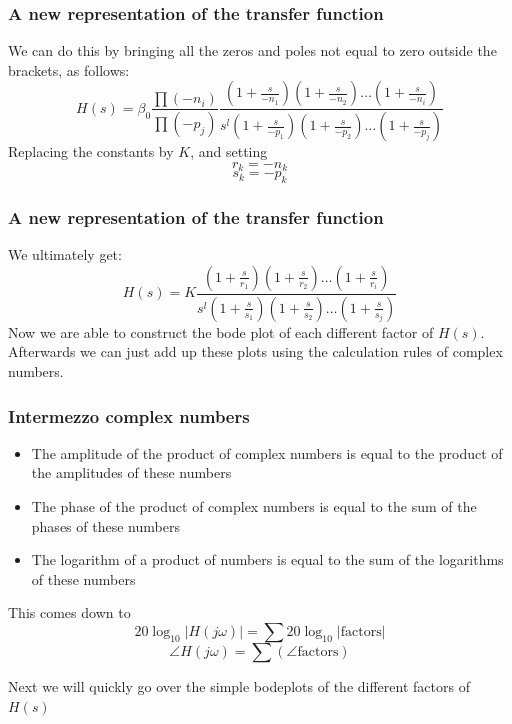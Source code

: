 \begin{frame}
\frametitle{A new representation of the transfer function}
We can do this by bringing all the zeros and poles not equal to zero outside the brackets, as follows:
$$H(s) = \beta_0 \frac{\prod(-n_i)}{\prod(-p_j)} \frac{(1+\frac{s}{-n_1}) (1+\frac{s}{-n_2}) \ldots (1+\frac{s}{-n_i})}{s^l (1+\frac{s}{-p_1}) (1+\frac{s}{-p_2}) \ldots (1 + \frac{s}{-p_j})}$$
 Replacing the constants by $K$, and setting $$r_k = -n_k$$ $$ s_k = -p_k$$ 



\end{frame}



\begin{frame}
\frametitle{A new representation of the transfer function}

We ultimately get: $$H(s) = K \frac{(1+\frac{s}{r_1}) (1+\frac{s}{r_2}) \ldots (1+\frac{s}{r_i})}{s^l (1+\frac{s}{s_1}) (1+\frac{s}{s_2}) \ldots (1 + \frac{s}{s_j})}$$
Now we are able to construct the bode plot of each different factor of $H(s)$. Afterwards we can just add up these plots using the calculation rules of complex numbers.

  
\end{frame}



\begin{frame}
\frametitle{Intermezzo complex numbers}
\begin{itemize}
\item The amplitude of the product of complex numbers is equal to the product of the amplitudes of these numbers
\item The phase of the product of complex numbers is equal to the sum of the phases of these numbers
\item The logarithm of a product of numbers is equal to the sum of the logarithms of these numbers

\end{itemize}
This comes down to 
$$ 20\log_{10}|H(j\omega)| = \sum 20\log_{10}|\text{factors}| $$ 
$$ \angle H(j\omega) = \sum(\angle \text{factors})$$

Next we will quickly go over the simple bodeplots of the different factors of $H(s)$

\end{frame}



